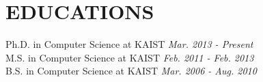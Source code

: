 \section{EDUCATIONS}

   Ph.D. in Computer Science at KAIST \textit{Mar. 2013 - Present}\\
   M.S. in Computer Science at KAIST \textit{Feb. 2011 - Feb. 2013}\\
   B.S. in Computer Science at KAIST \textit{Mar. 2006 - Aug. 2010}
